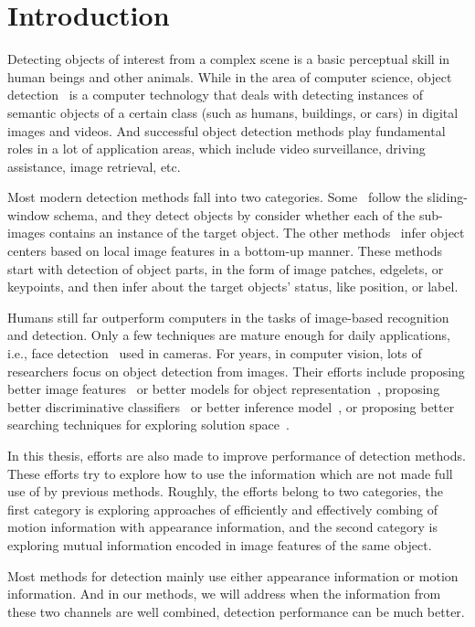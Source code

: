 \chapter{Introduction}
Detecting objects of interest from a complex scene is a basic perceptual skill in human beings and other animals.
While in the area of computer science, object detection~\citep{dod} is a computer technology that deals with detecting instances of semantic objects of a certain class (such as humans, buildings, or cars) in digital images and videos. And successful object detection
methods play fundamental roles in a lot of application areas, which include video surveillance, driving assistance, image retrieval, etc.

Most modern detection methods fall into two categories. Some~\citep{ij4,ac31,ac30,ac4,ac32,ac29,ac28,ac1} follow the sliding-window schema, and they detect objects by consider whether each of the sub-images contains an instance of the target object. The other methods~\citep{ac9,ac2,ac3,ac22,lb1,ac5,ac10,ac21,ac18} infer object centers based on local image features in a bottom-up manner. These methods start with detection of object parts, in the form of image patches, edgelets, or keypoints, and then infer about the target objects' status, like position, or label.


 Humans still far outperform computers in the tasks of image-based recognition and detection. Only a few techniques are mature enough for daily applications, i.e., face detection~\citep{face} used in cameras. For years, in computer vision, lots of researchers focus on object detection from images. Their efforts include proposing better image features~\citep{o17} or better models for object representation~\citep{bgf}, proposing better discriminative classifiers~\citep{dlearn} or better inference model~\citep{hdp}, or proposing better searching techniques for exploring solution space~\citep{bab}.

 In this thesis, efforts are also made to improve performance of detection methods. These efforts try to explore how to use the information which are not made full use of by previous methods. Roughly, the efforts belong to two categories, the first category is exploring approaches of efficiently and effectively combing of motion information with appearance information, and the second category is exploring mutual information encoded in image features of the same object.

 Most methods for detection mainly use either appearance information or motion information. And in our methods, we will address when the information from these two channels are well combined, detection performance can be much better.

